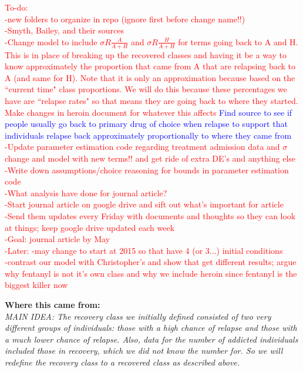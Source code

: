\documentclass[12pt]{article}
\begin{document}
\textcolor{red}{To-do: \\
-new folders to organize in repo (ignore first before change name!!) \\
-Smyth, Bailey, and their sources \\
-Change model to include $\sigma R \frac{A}{A+H}$ and $\sigma R \frac{H}{A+H}$ for terms going back to A and H. This is in place of breaking up the recovered classes and having it be a way to know approximately the proportion that came from A that are relapsing back to A (and same for H). Note that it is only an approximation because based on the ``current time" class proportions. We will do this because these percentages we have are ``relapse rates" so that means they are going back to where they started. Make changes in heroin document for whatever this affects \textcolor{blue}{Find source to see if people usually go back to primary drug of choice when relapse to support that individuals relapse back approximately proportionally to where they came from}\\ 
-Update parameter estimation code regarding treatment admission data and $\sigma$ change and model with new terms!! and get ride of extra DE's and anything else \\
-Write down assumptions/choice reasoning for bounds in parameter estimation code \\ 
-What analysis have done for journal article? \\
-Start journal article on google drive and sift out what's important for article \\
-Send them updates every Friday with documents and thoughts so they can look at things; keep google drive updated each week \\
-Goal: journal article by May \\
-Later: -may change to start at 2015 so that have 4 (or 3...) initial conditions \\
-contrast our model with Christopher's and show that get different results; argue why fentanyl is not it's own class and why we include heroin since fentanyl is the biggest killer now}

\textbf{Where this came from:} \\

\textit{MAIN IDEA: The recovery class we initially defined consisted of two very different groups of individuals: those with a high chance of relapse and those with a much lower chance of relapse. Also, data for the number of addicted individuals included those in recovery, which we did not know the number for. So we will redefine the recovery class to a recovered class as described above.} \\
\end{document}
